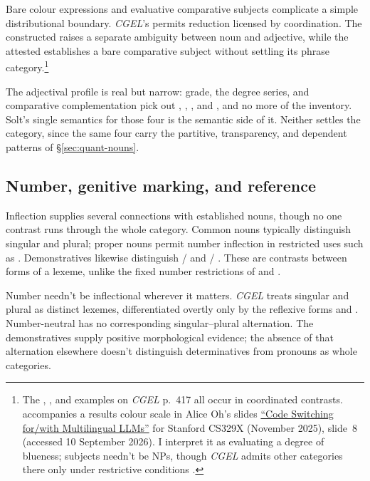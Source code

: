 \documentclass[12pt]{article}
\begin{document}
Bare colour expressions and evaluative comparative subjects complicate a simple distributional boundary. \textit{CGEL}'s  permits reduction licensed by coordination. The constructed  raises a separate ambiguity between noun and adjective, while the attested  establishes a bare comparative subject without settling its phrase category.\footnote{The , , and  examples on \textit{CGEL} p.~417 all occur in coordinated contrasts.  accompanies a results colour scale in Alice Oh's slides \href{https://web.stanford.edu/class/cs329x/slides/Lecture12_B_Codeswitching\%20LLMs.pdf}{\enquote{Code Switching for/with Multilingual LLMs}} for Stanford CS329X (November 2025), slide~8 (accessed 10 September 2026). I interpret it as evaluating a degree of blueness; subjects needn't be NPs, though \textit{CGEL} admits other categories there only under restrictive conditions \citep[236]{huddleston2002}.}

The adjectival profile is real but narrow: grade, the degree series, and comparative complementation pick out , , , and , and no more of the inventory. Solt's single semantics for those four is the semantic side of it. Neither settles the category, since the same four carry the partitive, transparency, and dependent patterns of §\ref{sec:quant-nouns}.

\subsection{Number, genitive marking, and reference}\label{sec:inflection}

Inflection supplies several connections with established nouns, though no one contrast runs through the whole category. Common nouns typically distinguish singular and plural; proper nouns permit number inflection in restricted uses such as  \citep[521]{huddleston2002}. Demonstratives likewise distinguish / and / \citep[373]{huddleston2002}. These are contrasts between forms of a lexeme, unlike the fixed number restrictions of  and .

Number needn't be inflectional wherever it matters. \textit{CGEL} treats singular and plural  as distinct lexemes, differentiated overtly only by the reflexive forms  and  \citep[486]{huddleston2002}. Number-neutral  has no corresponding singular--plural alternation. The demonstratives supply positive morphological evidence; the absence of that alternation elsewhere doesn't distinguish determinatives from pronouns as whole categories.
\end{document}
